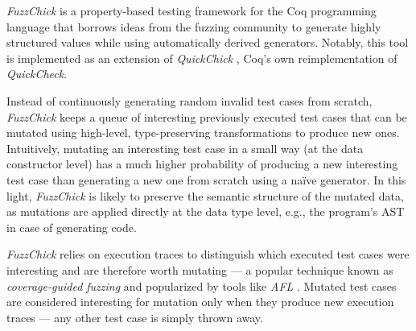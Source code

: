 \documentclass[acmsmall, anonymous]{acmart}
\newcommand{\quickcheck}{\textit{QuickCheck}\xspace}
\newcommand{\quickchick}{\textit{QuickChick}\xspace}
\newcommand{\fuzzchick}{\textit{FuzzChick}\xspace}
\begin{document}
\fuzzchick \cite{lampropoulos2019coverage} is a property-based testing framework
for the Coq programming language that borrows ideas from the fuzzing community
to generate highly structured values while using automatically derived
generators.
%
Notably, this tool is implemented as an extension of \quickchick
\cite{denes2014quickchick}, Coq's own reimplementation of \quickcheck.


Instead of continuously generating random invalid test cases from scratch,
\fuzzchick keeps a queue of interesting previously executed test cases that can
be mutated using high-level, type-preserving transformations to produce new
ones.
%
Intuitively, mutating an interesting test case in a small way (at the data
constructor level) has a much higher probability of producing a new interesting
test case than generating a new one from scratch using a na\"ive generator.
%
In this light, \fuzzchick is likely to preserve the semantic structure of the
mutated data, as mutations are applied directly at the data type level, e.g.,
the program's AST in case of generating code.


\fuzzchick relies on execution traces to distinguish which executed test cases
were interesting and are therefore worth mutating --- a popular technique known
as \emph{coverage-guided fuzzing} and popularized by tools like \emph{AFL}
\cite{afl}.
%
Mutated test cases are considered interesting for mutation only when they
produce new execution traces --- any other test case is simply thrown away.
\end{document}
